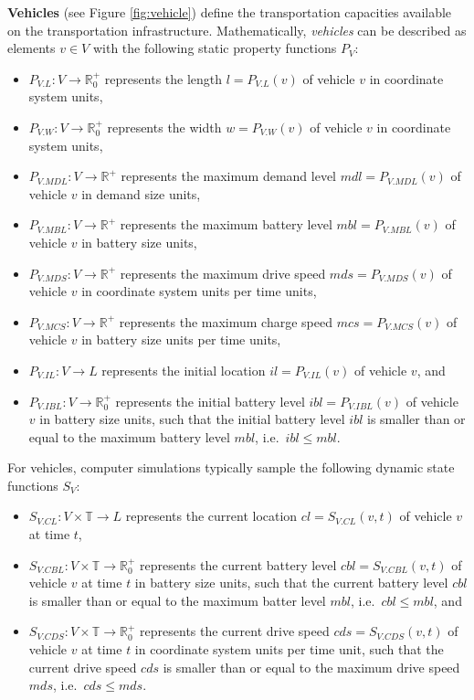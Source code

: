 \documentclass[graybox]{svmult}
\begin{document}
\noindent \textbf{Vehicles} (see Figure \ref{fig:vehicle})  define the transportation capacities available on the transportation infrastructure.
Mathematically, \textit{vehicles} can be described as elements $v \in V$ with the following static property functions $P_{V}$:
\begin{itemize}
	\item $P_{V.L}: V \rightarrow \mathbb{R}_0^+$ represents the length $l = P_{V.L}(v)$ of vehicle $v$ in coordinate system units,
	\item $P_{V.W}: V \rightarrow \mathbb{R}_0^+$ represents the width $w = P_{V.W}(v)$ of vehicle $v$ in coordinate system units,
	\item $P_{V.MDL}: V \rightarrow \mathbb{R}^+$ represents the maximum demand level $mdl = P_{V.MDL}(v)$ of vehicle $v$ in demand size units,
	\item $P_{V.MBL}: V \rightarrow \mathbb{R}^+$ represents the maximum battery level $mbl = P_{V.MBL}(v)$ of vehicle $v$ in battery size units,
	\item $P_{V.MDS}: V \rightarrow \mathbb{R}^+$ represents the maximum drive speed $mds = P_{V.MDS}(v)$ of vehicle $v$ in coordinate system units per time units,
	\item $P_{V.MCS}: V \rightarrow \mathbb{R}^+$ represents the maximum charge speed $mcs = P_{V.MCS}(v)$ of vehicle $v$ in battery size units per time units,
	\item $P_{V.IL}: V \rightarrow L$ represents the initial location $il = P_{V.IL}(v)$ of vehicle $v$, and
	\item $P_{V.IBL}: V \rightarrow \mathbb{R}_0^+$ represents the initial battery level $ibl = P_{V.IBL}(v)$ of vehicle $v$ in battery size units, such that the initial battery level $ibl$ is smaller than or equal to the maximum battery level $mbl$, i.e.\ $ibl \leq mbl$.
\end{itemize}
For vehicles, computer simulations typically sample the following dynamic state functions $S_{V}$:
\begin{itemize}
	\item $S_{V.CL}: V \times \mathbb{T} \rightarrow L$ represents the current location $cl = S_{V.CL}(v, t)$ of vehicle $v$ at time $t$,
	\item $S_{V.CBL}: V \times \mathbb{T} \rightarrow \mathbb{R}_0^+$ represents the current battery level $cbl = S_{V.CBL}(v, t)$ of vehicle $v$ at time $t$ in battery size units, such that the current battery level $cbl$ is smaller than or equal to the maximum batter level $mbl$, i.e.\ $cbl \leq mbl$, and
	\item $S_{V.CDS}: V \times \mathbb{T} \rightarrow \mathbb{R}_0^+$ represents the current drive speed $cds = S_{V.CDS}(v, t)$ of vehicle $v$ at time $t$ in coordinate system units per time unit, such that the current drive speed $cds$ is smaller than or equal to the maximum drive speed $mds$, i.e.\ $cds \leq mds$.
\end{itemize}
\end{document}
